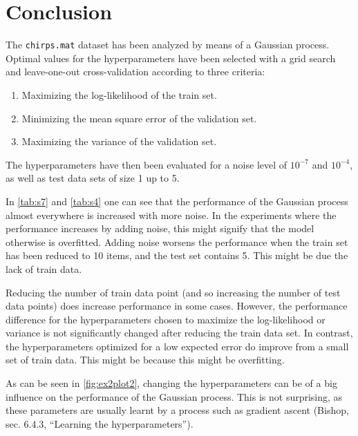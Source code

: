 \documentclass[a4paper,11pt]{article}
\begin{document}
\section{Conclusion}
The \texttt{chirps.mat} dataset has been analyzed by means of a Gaussian process.  Optimal values for the hyperparameters have been selected with a grid search and leave-one-out cross-validation according to three criteria:
\begin{enumerate}
  \item Maximizing the log-likelihood of the train set.
  \item Minimizing the mean square error of the validation set.
  \item Maximizing the variance of the validation set.
\end{enumerate}

The hyperparameters have then been evaluated for a noise level of $10^{-7}$ and $10^{-4}$, as well as test data sets of size 1 up to 5.  

In \autoref{tab:s7} and \autoref{tab:s4} one can see that the performance of the Gaussian process almost everywhere is increased with more noise.  In the experiments where the performance increases by adding noise, this might signify that the model otherwise is overfitted.  Adding noise worsens the performance when the train set has been reduced to 10 items, and the test set contains 5.  This might be due the lack of train data.

Reducing the number of train data point (and so increasing the number of test data points) does increase performance in some cases.  However, the performance difference for the hyperparameters chosen to maximize the log-likelihood or variance is not significantly changed after reducing the train data set.  In contrast, the hyperparameters optimized for a low expected error do improve from a small set of train data. This might be because this might be overfitting. 

As can be seen in \autoref{fig:ex2plot2}, changing the hyperparameters can be of a big influence on the performance of the Gaussian process.  This is not surprising, as these parameters are usually learnt by a process such as gradient ascent (Bishop, sec. 6.4.3, ``Learning the hyperparameters'').
\end{document}
